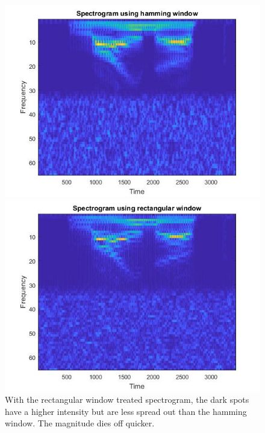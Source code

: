 \documentclass{article}
\begin{document}
\begin{figure}[H]
\includegraphics[scale = .5]{report8_1}
\includegraphics[scale = .5]{report8_2}
\\ With the rectangular window treated spectrogram, the dark spots have a higher intensity but are less spread out than the hamming window. The magnitude dies off
quicker.
\end{figure}
\end{document}
